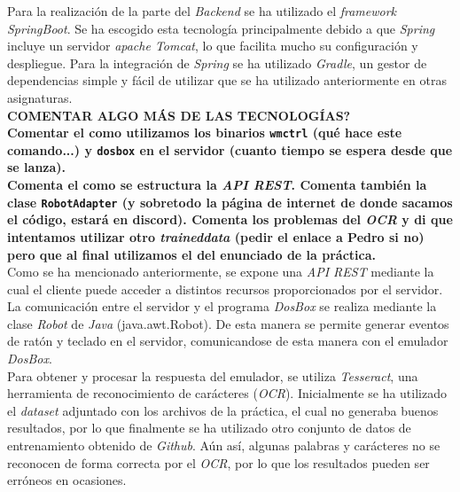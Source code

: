 \documentclass[10pt,a4paper]{article}
\begin{document}
Para la realización de la parte del \textit{Backend} se ha utilizado el \textit{framework SpringBoot}. Se ha escogido esta tecnología principalmente debido a que \textit{Spring} incluye un servidor \textit{apache Tomcat}, lo que facilita mucho su configuración y despliegue. Para la integración de \textit{Spring} se ha utilizado \textit{Gradle}, un gestor de dependencias simple y fácil de utilizar que se ha utilizado anteriormente en otras asignaturas.\\
\textbf{COMENTAR ALGO MÁS DE LAS TECNOLOGÍAS?}\\

{\Huge \textbf{Comentar el como utilizamos los binarios \texttt{wmctrl} (qué hace este comando...) y \texttt{dosbox} en el servidor (cuanto tiempo se espera desde que se lanza).}}\\

{\Huge \textbf{Comenta el como se estructura la \emph{API REST}. Comenta también la clase \texttt{RobotAdapter} (y sobretodo la página de internet de donde sacamos el código, estará en discord). Comenta los problemas del \emph{OCR} y di que intentamos utilizar otro \emph{traineddata} (pedir el enlace a Pedro si no) pero que al final utilizamos el del enunciado de la práctica. }}\\

Como se ha mencionado anteriormente, se expone una \textit{API REST} mediante la cual el cliente puede acceder a distintos recursos proporcionados por el servidor.\\
La comunicación entre el servidor y el programa \textit{DosBox} se realiza mediante la clase \textit{Robot} de \textit{Java} (java.awt.Robot). De esta manera se permite generar eventos de ratón y teclado en el servidor, comunicandose de esta manera con el emulador \textit{DosBox}. \\
Para obtener y procesar la respuesta del emulador, se utiliza \textit{Tesseract}, una herramienta de reconocimiento de carácteres (\textit{OCR}). Inicialmente se ha utilizado el \textit{dataset} adjuntado con los archivos de la práctica, el cual no generaba buenos resultados, por lo que finalmente se ha utilizado otro conjunto de datos de entrenamiento obtenido de \textit{Github}. Aún así, algunas palabras y carácteres no se reconocen de forma correcta por el \textit{OCR}, por lo que los resultados pueden ser erróneos en ocasiones. \\
\end{document}
